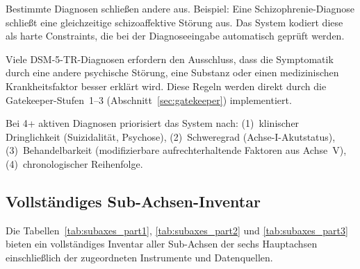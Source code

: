 \documentclass[11pt,a4paper]{article}
\begin{document}
\begin{description}[style=nextline, leftmargin=1.5cm, font=\bfseries]
\item[Hierarchische Exklusionsregeln] Bestimmte Diagnosen schlie\ss{}en andere aus. Beispiel: Eine Schizophrenie-Diagnose schlie\ss{}t eine gleichzeitige schizoaffektive St\"orung aus. Das System kodiert diese als harte Constraints, die bei der Diagnoseeingabe automatisch gepr\"uft werden.
\item[\glqq Due to another condition\grqq{}-Regeln] Viele DSM-5-TR-Diagnosen erfordern den Ausschluss, dass die Symptomatik durch eine andere psychische St\"orung, eine Substanz oder einen medizinischen Krankheitsfaktor besser erkl\"art wird. Diese Regeln werden direkt durch die Gatekeeper-Stufen~1--3 (Abschnitt~\ref{sec:gatekeeper}) implementiert.
\item[Erlaubte Komorbidit\"aten mit Priorisierung] Bei 4+ aktiven Diagnosen priorisiert das System nach: (1)~klinischer Dringlichkeit (Suizidalit\"at, Psychose), (2)~Schweregrad (Achse-I-Akutstatus), (3)~Behandelbarkeit (modifizierbare aufrechterhaltende Faktoren aus Achse~V), (4)~chronologischer Reihenfolge.
\end{description}


\clearpage
\subsection{Vollst\"andiges Sub-Achsen-Inventar}

Die Tabellen~\ref{tab:subaxes_part1}, \ref{tab:subaxes_part2} und \ref{tab:subaxes_part3} bieten ein vollst\"andiges Inventar aller Sub-Achsen der sechs Hauptachsen einschlie\ss{}lich der zugeordneten Instrumente und Datenquellen.
\end{document}

